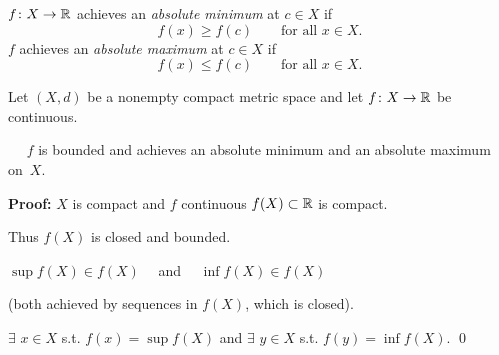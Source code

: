 \documentclass[10pt,aspectratio=169]{beamer}
\begin{document}
\begin{frame}

$f \colon X \to {\mathbb{R}}$ achieves an
\emph{absolute minimum} at $c \in X$ if
\begin{equation*}
f(x) \geq f(c) \qquad \text{for all } x \in X.
\end{equation*}
\pause
$f$ achieves an 
\emph{absolute maximum} at $c \in X$ if
\begin{equation*}
f(x) \leq f(c) \qquad \text{for all } x \in X.
\end{equation*}

\pause
\begin{theorem}
Let $(X,d)$ be a nonempty compact metric space
and let $f \colon X \to {\mathbb{R}}$ be continuous.

\pause
\thus ~~
$f$ is bounded and
achieves an absolute minimum and an absolute maximum on~$X$.
\end{theorem}

\pause
\textbf{Proof:}
$X$ is compact and $f$ continuous
\pause
\wthus
$f(X) \subset {\mathbb{R}}$ is compact.

\pause
Thus $f(X)$ is closed and bounded.

\pause
\thus \quad $\sup f(X) \in f(X)$ ~~and~~ $\inf f(X) \in f(X)$

(both achieved by sequences in $f(X)$, which is closed).

\pause
\medskip

\thus
\quad $\exists$ $x \in X$ s.t. $f(x) = \sup f(X)$
\pause
\quad and \quad
$\exists$ $y \in X$ s.t. $f(y) = \inf f(X)$.
\qed

\end{frame}
\end{document}
